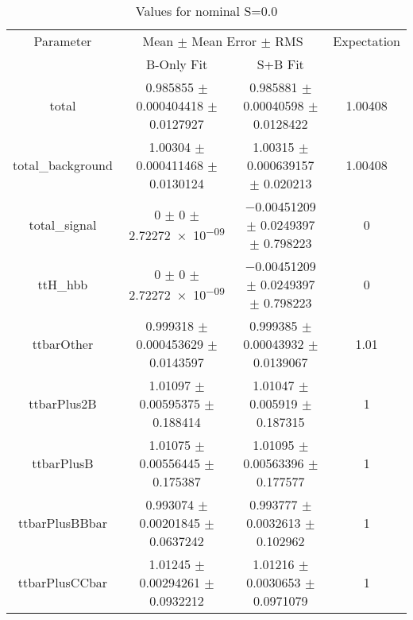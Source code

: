 \begin{table}
\centering
\caption{Values for nominal S=0.0}
\begin{tabular}{cccc}
\toprule
Parameter & \multicolumn{2}{c}{Mean $\pm$ Mean Error $\pm$ RMS} & Expectation\\
 & B-Only Fit & S+B Fit & \\
\midrule
total & \num{0.985855} $\pm$ \num{0.000404418} $\pm$ \num{0.0127927} & \num{0.985881} $\pm$ \num{0.00040598} $\pm$ \num{0.0128422} & \num{1.00408}\\
total\_background & \num{1.00304} $\pm$ \num{0.000411468} $\pm$ \num{0.0130124} & \num{1.00315} $\pm$ \num{0.000639157} $\pm$ \num{0.020213} & \num{1.00408}\\
total\_signal & \num{0} $\pm$ \num{0} $\pm$ \num{2.72272e-09} & \num{-0.00451209} $\pm$ \num{0.0249397} $\pm$ \num{0.798223} & \num{0}\\
ttH\_hbb & \num{0} $\pm$ \num{0} $\pm$ \num{2.72272e-09} & \num{-0.00451209} $\pm$ \num{0.0249397} $\pm$ \num{0.798223} & \num{0}\\
ttbarOther & \num{0.999318} $\pm$ \num{0.000453629} $\pm$ \num{0.0143597} & \num{0.999385} $\pm$ \num{0.00043932} $\pm$ \num{0.0139067} & \num{1.01}\\
ttbarPlus2B & \num{1.01097} $\pm$ \num{0.00595375} $\pm$ \num{0.188414} & \num{1.01047} $\pm$ \num{0.005919} $\pm$ \num{0.187315} & \num{1}\\
ttbarPlusB & \num{1.01075} $\pm$ \num{0.00556445} $\pm$ \num{0.175387} & \num{1.01095} $\pm$ \num{0.00563396} $\pm$ \num{0.177577} & \num{1}\\
ttbarPlusBBbar & \num{0.993074} $\pm$ \num{0.00201845} $\pm$ \num{0.0637242} & \num{0.993777} $\pm$ \num{0.0032613} $\pm$ \num{0.102962} & \num{1}\\
ttbarPlusCCbar & \num{1.01245} $\pm$ \num{0.00294261} $\pm$ \num{0.0932212} & \num{1.01216} $\pm$ \num{0.0030653} $\pm$ \num{0.0971079} & \num{1}\\
\bottomrule
\end{tabular}
\end{table}